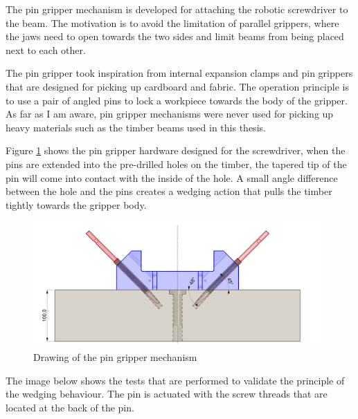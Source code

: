 The pin gripper mechanism is developed for attaching the robotic screwdriver to the beam. The motivation is to avoid the limitation of parallel grippers, where the jaws need to open towards the two sides and limit beams from being placed next to each other. 

The pin gripper took inspiration from internal expansion clamps and pin grippers that are designed for picking up cardboard and fabric. The operation principle is to use a pair of angled pins to lock a workpiece towards the body of the gripper. As far as I am aware, pin gripper mechanisms were never used for picking up heavy materials such as the timber beams used in this thesis.

Figure \ref{fig:pin-gripper-mechanism} shows the pin gripper hardware designed for the screwdriver, when the pins are extended into the pre-drilled holes on the timber, the tapered tip of the pin will come into contact with the inside of the hole. A small angle difference between the hole and the pins creates a wedging action that pulls the timber tightly towards the gripper body.  

\begin{figure}[!h]
    \centering
    \includegraphics[width=0.99\textwidth]{images/7a/img40.png}
    \caption{Drawing of the pin gripper mechanism}
    \label{fig:pin-gripper-mechanism}
\end{figure}

The image below shows the tests that are performed to validate the principle of the wedging behaviour. The pin is actuated with the screw threads that are located at the back of the pin. 


